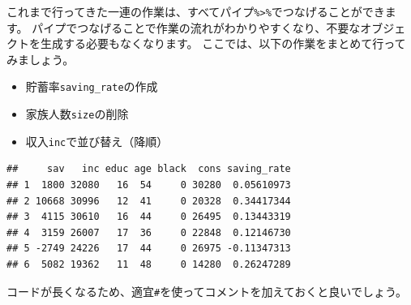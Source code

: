 \documentclass[]{book}
\newenvironment{Shaded}{\begin{snugshade}}{\end{snugshade}}
\newcommand{\KeywordTok}[1]{\textcolor[rgb]{0.13,0.29,0.53}{\textbf{#1}}}
\newcommand{\DataTypeTok}[1]{\textcolor[rgb]{0.13,0.29,0.53}{#1}}
\newcommand{\StringTok}[1]{\textcolor[rgb]{0.31,0.60,0.02}{#1}}
\newcommand{\CommentTok}[1]{\textcolor[rgb]{0.56,0.35,0.01}{\textit{#1}}}
\newcommand{\OperatorTok}[1]{\textcolor[rgb]{0.81,0.36,0.00}{\textbf{#1}}}
\newcommand{\NormalTok}[1]{#1}
\providecommand{\tightlist}{%
  \setlength{\itemsep}{0pt}\setlength{\parskip}{0pt}}
\begin{document}
これまで行ってきた一連の作業は、すべてパイプ\texttt{\%\textgreater{}\%}でつなげることができます。
パイプでつなげることで作業の流れがわかりやすくなり、不要なオブジェクトを生成する必要もなくなります。
ここでは、以下の作業をまとめて行ってみましょう。

\begin{itemize}
\tightlist
\item
  貯蓄率\texttt{saving\_rate}の作成
\item
  家族人数\texttt{size}の削除
\item
  収入\texttt{inc}で並び替え（降順）
\end{itemize}

\begin{Shaded}
\end{Shaded}

\begin{verbatim}
##     sav   inc educ age black  cons saving_rate
## 1  1800 32080   16  54     0 30280  0.05610973
## 2 10668 30996   12  41     0 20328  0.34417344
## 3  4115 30610   16  44     0 26495  0.13443319
## 4  3159 26007   17  36     0 22848  0.12146730
## 5 -2749 24226   17  44     0 26975 -0.11347313
## 6  5082 19362   11  48     0 14280  0.26247289
\end{verbatim}

コードが長くなるため、適宜\texttt{\#}を使ってコメントを加えておくと良いでしょう。

\begin{Shaded}
\end{Shaded}
\end{document}
